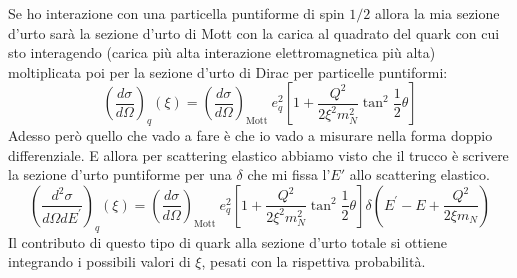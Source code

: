 Se ho interazione con una particella puntiforme di spin $1/2$ allora la mia sezione d'urto sarà la sezione d'urto di Mott con la carica al quadrato del quark con cui sto interagendo (carica più alta interazione elettromagnetica più alta) moltiplicata poi per la sezione d'urto di Dirac per particelle puntiformi:
\begin{equation*}
    \left(\frac{d \sigma}{d \Omega}\right)_q(\xi)=\left(\frac{d \sigma}{d \Omega}\right)_{\text {Mott }} e_q^2\left[1+\frac{Q^2}{2 \xi^2 m_N^2} \tan ^2 \frac{1}{2} \theta\right]
\end{equation*}
Adesso però quello che vado a fare è che io vado a misurare nella forma doppio differenziale. E allora per scattering elastico abbiamo visto che il trucco è scrivere la sezione d'urto puntiforme per una $\delta$ che mi fissa l'$E'$ allo scattering elastico.
\begin{equation*}
    \left(\frac{d^2 \sigma}{d \Omega d E^{\prime}}\right)_q(\xi)=\left(\frac{d \sigma}{d \Omega}\right)_{\text {Mott }} e_q^2\left[1+\frac{Q^2}{2 \xi^2 m_N^2} \tan ^2 \frac{1}{2} \theta\right] \delta\left(E^{\prime}-E+\frac{Q^2}{2 \xi m_N}\right)
\end{equation*}
Il contributo di questo tipo di quark alla sezione d'urto totale si ottiene integrando i possibili valori di $\xi$, pesati con la rispettiva probabilità.
